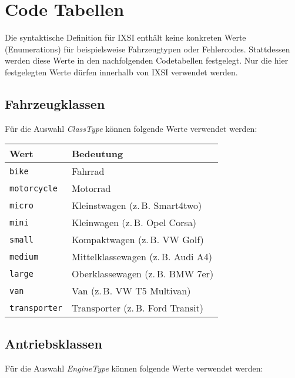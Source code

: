 \chapter{Code Tabellen}
\label{cha:CodeTabellen}
Die syntaktische Definition für IXSI enthält keine konkreten Werte (Enumerations) für beispielsweise Fahrzeugtypen oder Fehlercodes. Stattdessen werden diese Werte in den nachfolgenden Codetabellen festgelegt. Nur die hier festgelegten Werte dürfen innerhalb von IXSI verwendet werden.

\section{Fahrzeugklassen}
\label{sec:CodeTabellen:ClassType}
Für die Auswahl \emph{ClassType} können folgende Werte verwendet werden:

\begin{flushleft}
\begin{tabularx}{\linewidth}{l>{\raggedright\arraybackslash}X}
\toprule
Wert & Bedeutung\\
\midrule
\verb|bike| & Fahrrad\\
\verb|motorcycle| & Motorrad\\
\verb|micro| & Kleinstwagen (z.\,B. Smart4two)\\
\verb|mini| & Kleinwagen (z.\,B. Opel Corsa)\\
\verb|small| & Kompaktwagen (z.\,B. VW Golf)\\
\verb|medium| & Mittelklassewagen (z.\,B. Audi A4)\\
\verb|large| & Oberklassewagen (z.\,B. BMW 7er)\\
\verb|van| & Van (z.\,B. VW T5 Multivan)\\
\verb|transporter| & Transporter (z.\,B. Ford Transit)\\
\bottomrule
\end{tabularx}
\end{flushleft}

\section{Antriebsklassen}
\label{sec:CodeTabellen:EngineType}
Für die Auswahl \emph{EngineType} können folgende Werte verwendet werden:

